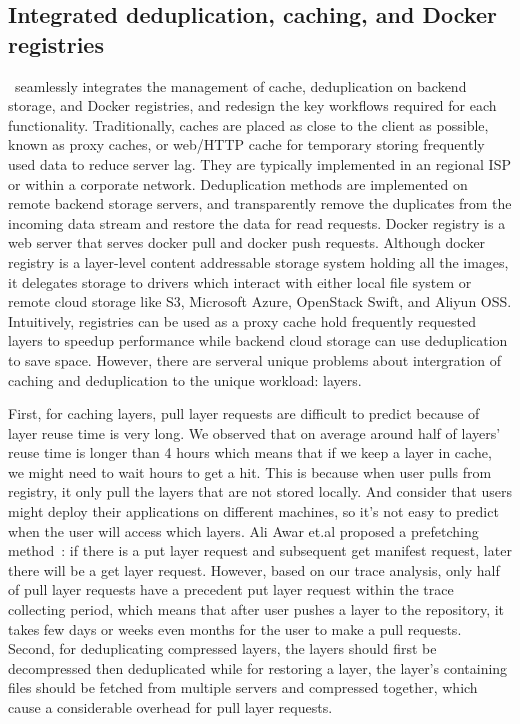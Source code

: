 \subsection{Integrated deduplication, caching, and Docker registries}
\label{sec:design}

%

%
%
%

\sysname~seamlessly integrates the management of cache, deduplication on backend storage, and Docker registries,
and redesign the key workflows required for each functionality. 
Traditionally, caches are placed as close to the client as possible, known as proxy caches, or web/HTTP cache for temporary storing 
frequently used data to reduce server lag. 
They are typically implemented in an regional ISP or within a corporate network.
Deduplication methods are implemented on remote backend storage servers, and
transparently remove the duplicates from the incoming data stream and restore the data for read requests. 
Docker registry is a web server that serves docker pull and docker push requests.
Although docker registry is a layer-level content addressable storage system holding all the images,
it delegates storage to drivers which interact with either local file system or remote cloud storage like S3, Microsoft Azure, OpenStack Swift, and Aliyun OSS.
Intuitively, registries can be used as a proxy cache hold frequently requested layers to speedup performance 
while backend cloud storage can use deduplication to save space.
However, there are serveral unique problems about intergration of caching and deduplication to the unique workload: layers.

First, for caching layers, pull layer requests are difficult to predict because of layer reuse time is 
very long. We observed that on average around half of layers' reuse time is longer than 4 hours which means 
that if we keep a layer in cache, we might need to wait hours to get a hit.
This is because when user pulls from registry, it only pull the layers that are not stored locally. 
And consider that users might deploy their applications on different machines, so it's not easy to predict 
when the user will access which layers.
Ali Awar et.al proposed a prefetching method~\cite{anwarfast}: if there is a put layer request and subsequent get manifest request, later there will be a 
get layer request.
However, based on our trace analysis, only half of pull layer requests have a precedent put layer request within the trace collecting period, which means that
after user pushes a layer to the repository, it takes few days or weeks even months for the user to make a pull requests.
Second, for deduplicating compressed layers, the layers should first be decompressed then deduplicated while for restoring a layer, the layer's
containing files should be fetched from multiple servers and compressed together, which cause a considerable overhead for pull layer requests.

